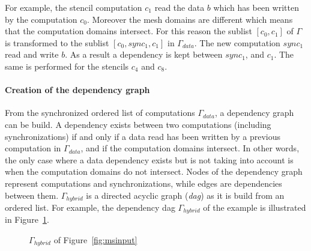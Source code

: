 For example, the stencil computation $c_1$ read the data $b$ which has been written by the computation $c_0$. Moreover the mesh domains are different which means that the computation domains intersect. For this reason the sublist $[c_0,c_1]$ of $\Gamma$ is transformed to the sublist $[c_0,sync_1,c_1]$ in $\Gamma_{data}$. The new computation $sync_1$ read and write $b$. As a result a dependency is kept between $sync_1$, and $c_1$. The same is performed for the stencils $c_4$ and $c_8$.

\paragraph{Creation of the dependency graph} From the synchronized ordered list of computations $\Gamma_{data}$, a dependency graph can be build. A dependency exists between two computations (including synchronizations) if and only if a data read has been written by a previous computation in $\Gamma_{data}$, and if the computation domains intersect. In other words, the only case where a data dependency exists but is not taking into account is when the computation domains do not intersect. Nodes of the dependency graph represent computations and synchronizations, while edges are dependencies between them. $\Gamma_{hybrid}$ is a directed acyclic graph (\emph{dag}) as it is build from an ordered list. For example, the dependency dag $\Gamma_{hybrid}$ of the example is illustrated in Figure~\ref{fig:hyb}.

\begin{figure}[h!]
\begin{center}
\caption{$\Gamma_{hybrid}$ of Figure~\ref{fig:msinput}}
\label{fig:hyb}
\end{center}
\end{figure}


